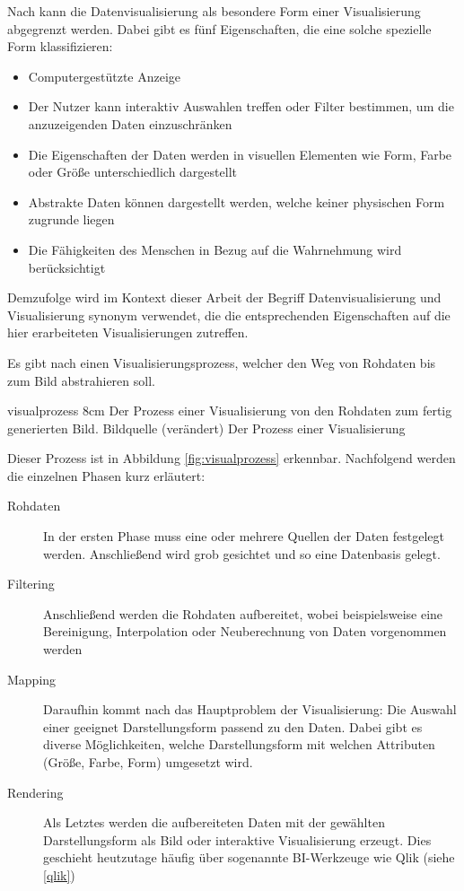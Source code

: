 Nach \cite{Card.2007} kann die Datenvisualisierung als besondere Form einer Visualisierung abgegrenzt werden.
Dabei gibt es fünf Eigenschaften, die eine solche spezielle Form klassifizieren:
\begin{itemize}
\item Computergestützte Anzeige 
\item Der Nutzer kann interaktiv Auswahlen treffen oder Filter bestimmen, um die anzuzeigenden Daten einzuschränken
\item Die Eigenschaften der Daten werden in visuellen Elementen wie Form, Farbe oder Größe unterschiedlich dargestellt
\item Abstrakte Daten können dargestellt werden, welche keiner physischen Form zugrunde liegen
\item Die Fähigkeiten des Menschen in Bezug auf die Wahrnehmung wird berücksichtigt 
\end{itemize}

Demzufolge wird im Kontext dieser Arbeit der Begriff Datenvisualisierung und Visualisierung synonym verwendet, die die entsprechenden Eigenschaften auf die hier erarbeiteten Visualisierungen zutreffen.

Es gibt nach \cite{Schumann.2000} einen \glqq Visualisierungsprozess\grqq{}, welcher den Weg von Rohdaten bis zum Bild abstrahieren soll.

\bild
{visualprozess}
{8cm}
{Der Prozess einer Visualisierung von den Rohdaten zum fertig generierten Bild. Bildquelle \cite[S.50]{FischerStabel.2018} (verändert)}
{Der Prozess einer Visualisierung}

Dieser Prozess ist in Abbildung \ref{fig:visualprozess} erkennbar.
Nachfolgend werden die einzelnen Phasen kurz erläutert:
\begin{description}
\item[Rohdaten] In der ersten Phase muss eine oder mehrere Quellen der Daten festgelegt werden. 
Anschließend wird grob gesichtet und so eine Datenbasis gelegt.
\item[Filtering] Anschließend werden die Rohdaten aufbereitet, wobei beispielsweise eine Bereinigung, Interpolation oder Neuberechnung von Daten vorgenommen werden
\item[Mapping] Daraufhin kommt nach \cite{FischerStabel.2018} das Hauptproblem der Visualisierung: Die Auswahl einer geeignet Darstellungsform passend zu den Daten. 
Dabei gibt es diverse Möglichkeiten, welche Darstellungsform mit welchen Attributen (Größe, Farbe, Form) umgesetzt wird. 
\item[Rendering] Als Letztes werden die aufbereiteten Daten mit der gewählten Darstellungsform als Bild oder interaktive Visualisierung erzeugt.
Dies geschieht heutzutage häufig über sogenannte \gls{BI}-Werkzeuge wie Qlik (siehe \ref{qlik})
\end{description}




